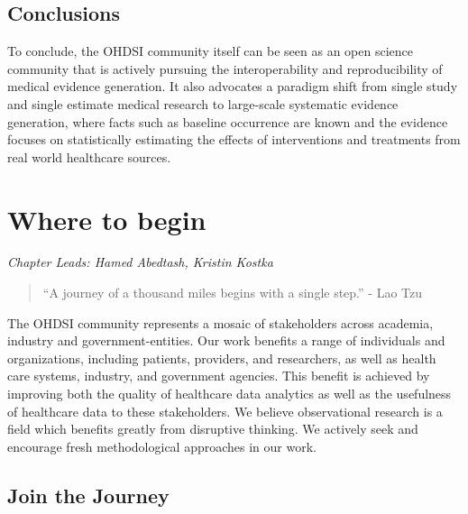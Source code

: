 \documentclass[11pt]{book}
\theoremstyle{definition}
\theoremstyle{definition}
\theoremstyle{definition}
\theoremstyle{remark}
\begin{document}
\hypertarget{conclusions}{%
\section{Conclusions}\label{conclusions}}

To conclude, the OHDSI community itself can be seen as an open science community that is actively pursuing the interoperability and reproducibility of medical evidence generation. It also advocates a paradigm shift from single study and single estimate medical research to large-scale systematic evidence generation, where facts such as baseline occurrence are known and the evidence focuses on statistically estimating the effects of interventions and treatments from real world healthcare sources.

\hypertarget{WhereToBegin}{%
\chapter{Where to begin}\label{WhereToBegin}}

\emph{Chapter Leads: Hamed Abedtash, Kristin Kostka}

\begin{quote}
``A journey of a thousand miles begins with a single step.'' - Lao Tzu
\end{quote}

The OHDSI community represents a mosaic of stakeholders across academia, industry and government-entities. Our work benefits a range of individuals and organizations, including patients, providers, and researchers, as well as health care systems, industry, and government agencies. This benefit is achieved by improving both the quality of healthcare data analytics as well as the usefulness of healthcare data to these stakeholders. We believe observational research is a field which benefits greatly from disruptive thinking. We actively seek and encourage fresh methodological approaches in our work. 

\hypertarget{join-the-journey}{%
\section{Join the Journey}\label{join-the-journey}}
\end{document}

